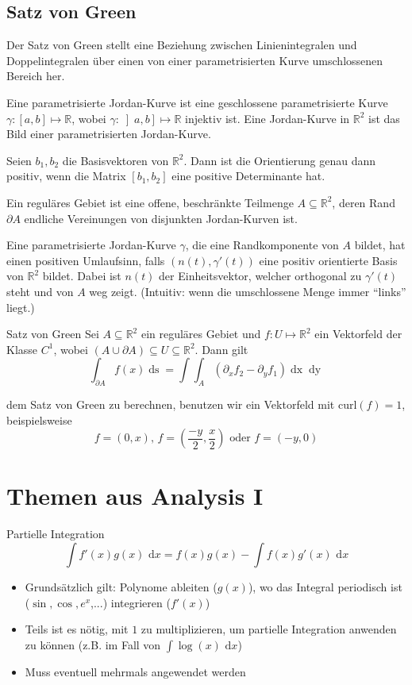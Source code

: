 \documentclass[a4paper,10pt]{article}
\def\R{\mathbb{R}}
\def\dx{\text{ d}x}
\begin{document}
\subsection{Satz von Green}
Der Satz von Green stellt eine Beziehung zwischen Linienintegralen und Doppelintegralen über einen von einer parametrisierten Kurve umschlossenen Bereich her. 

Eine parametrisierte Jordan-Kurve ist eine geschlossene parametrisierte Kurve \(\gamma : \left[a,b\right] \mapsto \R\), wobei \(\gamma : \left] a,b \right] \mapsto \R\) injektiv ist. Eine Jordan-Kurve in \(\R^2\) ist das Bild einer parametrisierten Jordan-Kurve.

Seien \(b_1, b_2\) die Basisvektoren von \(\R^2\). Dann ist die Orientierung genau dann positiv, wenn die Matrix \(\left[b_1, b_2\right]\) eine positive Determinante hat.

Ein reguläres Gebiet ist eine offene, beschränkte Teilmenge \(A\subseteq \R^2\), deren Rand \(\partial A\) endliche Vereinungen von disjunkten Jordan-Kurven ist.

Eine parametrisierte Jordan-Kurve \(\gamma\), die eine Randkomponente von \(A\) bildet, hat einen positiven Umlaufsinn, falls \((n(t), \gamma'(t))\) eine positiv orientierte Basis von \(\R^2\) bildet. Dabei ist \(n(t)\) der Einheitsvektor, welcher orthogonal zu \(\gamma'(t)\) steht und von \(A\) weg zeigt. (Intuitiv: wenn die umschlossene Menge immer ``links'' liegt.)

\begin{mainbox}{Satz von Green}
  Sei \(A \subseteq \R^2\) ein reguläres Gebiet und \(f: U \mapsto \R^2\) ein Vektorfeld der Klasse \(C^1\), wobei \((A \cup \partial A) \subseteq U \subseteq \R^2\). Dann gilt
  \[\int_{\partial A} f(x) \mathop{ds} = \int \int_A \left(\partial_x f_2 - \partial_y f_1\right) \mathop{dx} \mathop{dy}\]
\end{mainbox}
 dem Satz von Green zu berechnen, benutzen wir ein Vektorfeld mit \(\text{curl}(f) = 1\), beispielsweise \[f = (0,x) \text{, } f = (\frac{-y}{2}, \frac{x}{2}) \text{ oder } f = (-y, 0)\]

\section{Themen aus Analysis I}
\begin{mainbox}{Partielle Integration}
 $$\int f'(x) g(x) \dx = f(x)g(x) - \int f(x) g'(x) \dx$$
\end{mainbox}
\begin{itemize}
 \item Grundsätzlich gilt: Polynome ableiten ($g(x)$), wo das Integral periodisch ist ($\sin, \cos, e^x$,...) integrieren ($f'(x)$)
 \item Teils ist es nötig, mit $1$ zu multiplizieren, um partielle Integration anwenden zu können (z.B. im Fall von $\int \log(x) \dx$)
 \item Muss eventuell mehrmals angewendet werden
\end{itemize}
\end{document}
